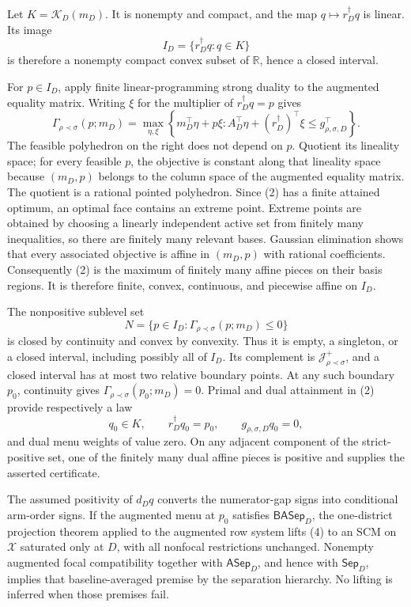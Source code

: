 Let \(K=\mathcal K_D(m_D)\). It is nonempty and compact, and the map \(q\mapsto r_D^\dagger q\) is linear. Its image
\[
I_D=\{r_D^\dagger q:q\in K\}\tag{1}
\]
is therefore a nonempty compact convex subset of \(\mathbb R\), hence a closed interval.

For \(p\in I_D\), apply finite linear-programming strong duality to the augmented equality matrix. Writing \(\xi\) for the multiplier of \(r_D^\dagger q=p\) gives
\[
\Gamma_{\rho\prec\sigma}(p;m_D)
=\max_{\eta,\xi}\left\{m_D^\top\eta+p\xi:
A_D^\top\eta+(r_D^\dagger)^\top\xi\leq g_{\rho,\sigma,D}^\top\right\}.\tag{2}
\]
The feasible polyhedron on the right does not depend on \(p\). Quotient its lineality space; for every feasible \(p\), the objective is constant along that lineality space because \((m_D,p)\) belongs to the column space of the augmented equality matrix. The quotient is a rational pointed polyhedron. Since (2) has a finite attained optimum, an optimal face contains an extreme point. Extreme points are obtained by choosing a linearly independent active set from finitely many inequalities, so there are finitely many relevant bases. Gaussian elimination shows that every associated objective is affine in \((m_D,p)\) with rational coefficients. Consequently (2) is the maximum of finitely many affine pieces on their basis regions. It is therefore finite, convex, continuous, and piecewise affine on \(I_D\).

The nonpositive sublevel set
\[
N=\{p\in I_D:\Gamma_{\rho\prec\sigma}(p;m_D)\leq0\}\tag{3}
\]
is closed by continuity and convex by convexity. Thus it is empty, a singleton, or a closed interval, including possibly all of \(I_D\). Its complement is \(\mathcal J_{\rho\prec\sigma}^+\), and a closed interval has at most two relative boundary points. At any such boundary \(p_0\), continuity gives
\(\Gamma_{\rho\prec\sigma}(p_0;m_D)=0\). Primal and dual attainment in (2) provide respectively a law
\[
q_0\in K,\qquad r_D^\dagger q_0=p_0,\qquad
g_{\rho,\sigma,D}q_0=0,\tag{4}
\]
and dual menu weights of value zero. On any adjacent component of the strict-positive set, one of the finitely many dual affine pieces is positive and supplies the asserted certificate.

The assumed positivity of \(d_Dq\) converts the numerator-gap signs into conditional arm-order signs. If the augmented menu at \(p_0\) satisfies \(\mathsf{BASep}_D\), the one-district projection theorem applied to the augmented row system lifts (4) to an SCM on \(\mathcal X\) saturated only at \(D\), with all nonfocal restrictions unchanged. Nonempty augmented focal compatibility together with \(\mathsf{ASep}_D\), and hence with \(\mathsf{Sep}_D\), implies that baseline-averaged premise by the separation hierarchy. No lifting is inferred when those premises fail.